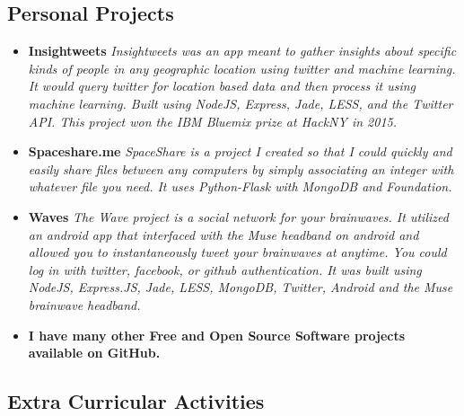 \documentclass[12pt,a4paper,sans]{moderncv}        %
\begin{document}
\vspace{10pt}

\subsection{Personal Projects}

\vspace{5pt}

\begin{itemize}

\item{\textbf{Insightweets}\textit{ Insightweets was an app meant to gather insights about specific kinds of people in any geographic location using twitter and machine learning. It would query twitter for location based data and then process it using machine learning. Built using NodeJS, Express, Jade, LESS, and the Twitter API. This project won the IBM Bluemix prize at HackNY in 2015.}}

\vspace{5pt}

\item{\textbf{Spaceshare.me}\textit{ SpaceShare is a project I created so that I could quickly and easily share files between any computers by simply associating an integer with whatever file you need. It uses Python-Flask with MongoDB and Foundation.}}

\vspace{5pt}

\item{\textbf{Waves}\textit{ The Wave project is a social network for your brainwaves. It utilized an android app that interfaced with the Muse headband on android and allowed you to instantaneously tweet your brainwaves at anytime. You could log in with twitter, facebook, or github authentication. It was built using NodeJS, Express.JS, Jade, LESS, MongoDB, Twitter, Android and the Muse brainwave headband.}}

\vspace{5pt}

\item{\textbf{I have many other Free and Open Source Software projects available on GitHub.} }

\vspace{5pt}

\end{itemize}

\subsection{Extra Curricular Activities}
\end{document}
